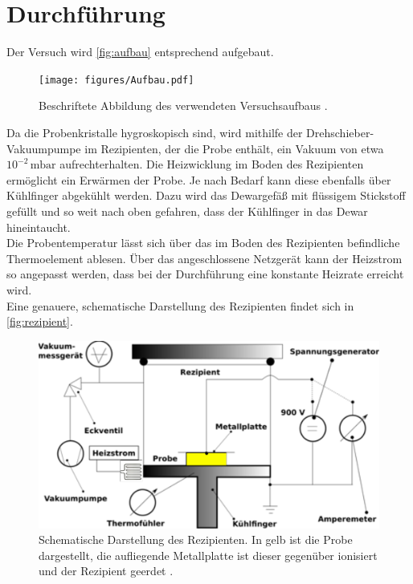 \section{Durchführung}
\label{sec:Durchführung}

Der Versuch wird \autoref{fig:aufbau} entsprechend aufgebaut.

\begin{figure}[H]
    \centering
    \texttt{[image: figures/Aufbau.pdf]}
    \caption{Beschriftete Abbildung des verwendeten Versuchsaufbaus \cite{v48}.}
    \label{fig:aufbau}
\end{figure}

Da die Probenkristalle hygroskopisch sind, wird mithilfe der Drehschieber-Vakuumpumpe im Rezipienten, der die Probe enthält, ein Vakuum von etwa $10^{-2} \,\si{\milli\bar}$ aufrechterhalten. 
Die Heizwicklung im Boden des Rezipienten ermöglicht ein Erwärmen der Probe.
Je nach Bedarf kann diese ebenfalls über Kühlfinger abgekühlt werden. Dazu wird das Dewargefäß mit flüssigem Stickstoff gefüllt und so weit nach oben gefahren, dass der Kühlfinger in das Dewar hineintaucht. \\
Die Probentemperatur lässt sich über das im Boden des Rezipienten befindliche Thermoelement ablesen.
Über das angeschlossene Netzgerät kann der Heizstrom so angepasst werden, dass bei der Durchführung eine konstante Heizrate erreicht wird. \\
Eine genauere, schematische Darstellung des Rezipienten findet sich in \autoref{fig:rezipient}.

\begin{figure}[H]
    \centering
    \includegraphics[width=\textwidth]{figures/Rezipient.pdf}
    \caption{Schematische Darstellung des Rezipienten. In gelb ist die Probe dargestellt, die aufliegende Metallplatte ist dieser gegenüber ionisiert und der Rezipient geerdet \cite{v48}.}
    \label{fig:rezipient}
\end{figure}

